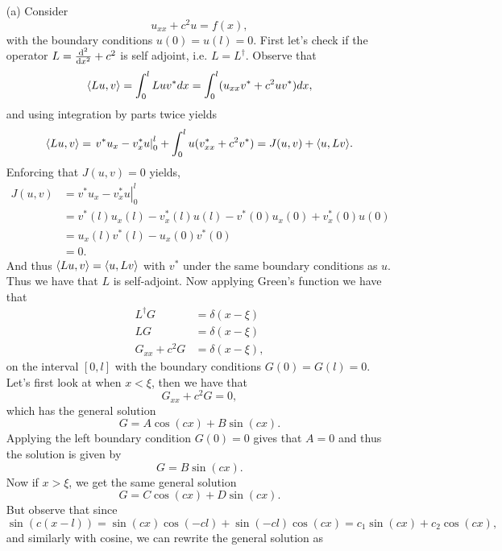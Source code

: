 \documentclass[12pt]{report}
\begin{document}
\begin{solution}

    \noindent
    \begin{enumerate}
        \item [(a)]
        Consider
        \[ 
            u_{xx} + c^2u = f(x),
        \]
        with the boundary conditions $u(0) = u(l) = 0$. First let's check if the operator $L = \frac{\mathrm{d}^{2} }{\mathrm{d} x^{2}} + c^2$ is self adjoint, i.e. $L = L^\dag$. Observe that
        \begin{align*}
            {\left\langle Lu,v\right\rangle} = \int_0^l Lu v^* dx = \int_0^l (u_{xx} v^* + c^2 u v^*)dx,
        \end{align*}
        and using integration by parts twice yields
        \[ 
            {\left\langle Lu,v\right\rangle} = \left. v^*u_x - v_x^*u\right|^l_0 + \int_0^l u(v^*_{xx} + c^2v^*)= J(u,v) + {\left\langle u,Lv\right\rangle}.
        \]
        Enforcing that $J(u,v) = 0$ yields,
        \begin{align*}
            J(u,v) &= \left. v^*u_x - v_x^*u\right|^l_0\\
            &= v^*(l)u_x(l) - v_x^*(l)u(l) - v^*(0)u_x(0) + v^*_x(0)u(0)\\
            &= u_x(l) v^*(l) - u_x(0)v^*(0)\\
            &= 0.
        \end{align*} 
        And thus ${\left\langle Lu,v\right\rangle} = {\left\langle u,Lv\right\rangle}$ with $v^*$ under the same boundary conditions as $u$. Thus we have that $L$ is self-adjoint. Now applying Green's function we have that
        \begin{align*}
            L^\dag G &= \delta(x - \xi)\\
            LG &= \delta(x - \xi)\\
            G_{xx} + c^2 G &= \delta(x - \xi),
        \end{align*}
        on the interval $[0,l]$ with the boundary conditions $G(0)=G(l)=0.$
        Let's first look at when $x < \xi$, then we have that
        \[ 
            G_{xx} + c^2 G = 0,
        \]
        which has the general solution
        \[ 
            G = A\cos(cx) + B \sin(cx).
        \]
        Applying the left boundary condition $G(0) = 0$ gives that $A=0$ and thus the solution is given by
        \[ 
            G = B\sin(cx).
        \]
        Now if $x > \xi$, we get the same general solution 
        \[ 
            G = C\cos(cx) + D\sin(cx).
        \]
        But observe that since
        \[ 
            \sin(c(x - l)) = \sin(cx)\cos(-cl) + \sin(-cl)\cos(cx) = c_1\sin(cx) + c_2\cos(cx),
        \]
        and similarly with cosine, we can rewrite the general solution as

\end{enumerate}
\end{solution}
\end{document}
